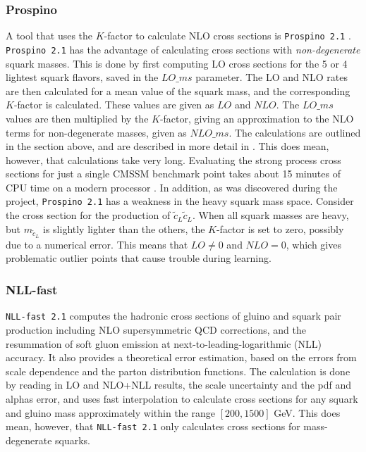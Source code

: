 \documentclass[twoside,english]{uiofysmaster}
\begin{document}
\subsubsection{Prospino}\label{sec:Prospino}
A tool that uses the $K$-factor to calculate NLO cross sections is \verb|Prospino 2.1| \cite{beenakker1996prospino}. \verb|Prospino 2.1| has the advantage of calculating cross sections with \textit{non-degenerate} squark masses. This is done by first computing LO cross sections for the 5 or 4 lightest squark flavors, saved in the $LO\_ms$ parameter. The LO and NLO rates are then calculated for a mean value of the squark mass, and the corresponding $K$-factor is calculated. These values are given as $LO$ and $NLO$. The $LO\_ms$ values are then multiplied by the $K$-factor, giving an approximation to the NLO terms for non-degenerate masses, given as $NLO\_ms$. The calculations are outlined in the section above, and are described in more detail in \cite{beenakker1996prospino}. This does mean, however, that calculations take very long. Evaluating the strong process cross sections for just a single CMSSM benchmark point takes about 15 minutes of CPU time on a modern processor \cite{balazs2017colliderbit}. In addition, as was discovered during the project, \verb|Prospino 2.1| has a weakness in the heavy squark mass space. Consider the cross section for the production of $\tilde{c}_L \tilde{c}_L$. When all squark masses are heavy, but $m_{\tilde{c}_L}$ is slightly lighter than the others, the $K$-factor is set to zero, possibly due to a numerical error. This means that $LO \neq 0$ and $NLO =0$, which gives problematic outlier points that cause trouble during learning.



\subsubsection{NLL-fast}

\verb|NLL-fast 2.1| \cite{beenakker1997squark, kulesza2009threshold, kulesza2009soft, beenakker2009soft, beenakker2011squark} computes the hadronic cross sections of gluino and squark pair production including NLO supersymmetric QCD corrections, and the resummation of soft gluon emission at next-to-leading-logarithmic (NLL) accuracy. It also provides a theoretical error estimation, based on the errors from scale dependence and the parton distribution functions. The calculation is done by reading in LO and NLO+NLL results, the scale uncertainty and the pdf and alphas error, and uses fast interpolation to calculate cross sections for any squark and gluino mass approximately within the range $[200, 1500]$ GeV. This does mean, however, that \verb|NLL-fast 2.1| only calculates cross sections for mass-degenerate squarks.
\end{document}
